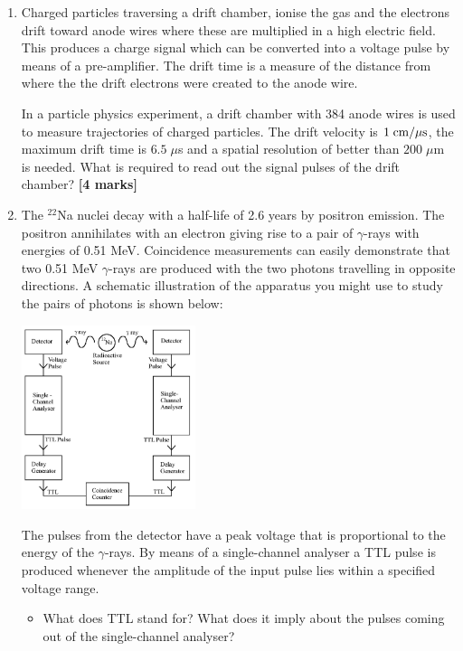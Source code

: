 \begin{enumerate}
%
\hfill {\bf [2 marks]}\\

\item Charged particles traversing a drift chamber, ionise the gas and the electrons drift toward anode wires where these are multiplied in a high electric field. This produces a charge signal which can be converted into a voltage pulse by means of a pre-amplifier. 
The drift time is a measure of the distance from where the the drift electrons were created to the anode wire.

In a particle physics experiment, a drift chamber with 384 anode wires is used to measure trajectories of charged particles. 
The drift velocity is $1\; {\rm cm/\mu s}$, the maximum drift time is $6.5 \; \mu$s
and  a spatial resolution of  better than $200\; \mu$m is needed.
What is required to read out the signal pulses of the drift chamber?
\hfill {\bf [4 marks]}\\

\item The $^{22}$Na nuclei decay with a half-life of 2.6 years by positron emission. The positron annihilates with an electron giving rise to a pair of $\gamma$-rays with energies of 0.51 MeV. 
Coincidence measurements can easily demonstrate that two 0.51 MeV $\gamma$-rays are produced  with the two photons travelling in opposite directions. A schematic illustration of the apparatus you might use to study the pairs of photons is shown below:
%
\begin{center}                                        
 {\includegraphics[width=0.40\textwidth]{figs/positron-annihilation}}
 \end{center}
%
The pulses from the detector have a peak voltage that is proportional to the energy of the $\gamma$-rays. By means of  a  single-channel analyser  a TTL pulse is  produced whenever the amplitude of the input pulse lies within a specified voltage range.
\begin{itemize}
\item What does TTL stand for? What does it imply about the pulses coming out of the single-channel analyser?


\end{itemize}
\end{enumerate}
